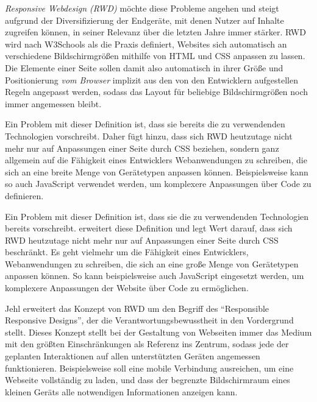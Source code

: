 \emph{Responsive Webdesign (RWD)} möchte diese Probleme angehen und steigt aufgrund der Diversifizierung der Endgeräte, mit denen Nutzer auf Inhalte zugreifen können, in seiner Relevanz über die letzten Jahre immer stärker.
RWD wird nach W3Schools \autocite{W3Schools.ResponsiveWebDesign.2024} als die Praxis definiert, Websites sich automatisch an verschiedene Bildschirmgrößen mithilfe von HTML und CSS anpassen zu lassen.
Die Elemente einer Seite sollen damit also automatisch in ihrer Größe und Positionierung \emph{vom Browser} implizit aus den von den Entwicklern aufgestellen Regeln angepasst werden, sodass das Layout für beliebige Bildschirmgrößen noch immer angemessen bleibt.

Ein Problem mit dieser Definition ist, dass sie bereits die zu verwendenden Technologien vorschreibt.
Daher fügt \autocite[S. 28]{Laati.ImplementingResponsiveDesignInIndustrialDashboardEditor.2017} hinzu, dass sich RWD heutzutage nicht mehr nur auf Anpassungen einer Seite durch CSS beziehen, sondern ganz allgemein auf die Fähigkeit eines Entwicklers Webanwendungen zu schreiben, die sich an eine breite Menge von Gerätetypen anpassen können.
Beispielsweise kann so auch JavaScript verwendet werden, um komplexere Anpassungen über Code zu definieren.

Ein Problem mit dieser Definition ist, dass sie die zu verwendenden Technologien bereits vorschreibt.
\autocite[S. 28]{Laati.ImplementingResponsiveDesignInIndustrialDashboardEditor.2017} erweitert diese Definition und legt Wert darauf, dass sich RWD heutzutage nicht mehr nur auf Anpassungen einer Seite durch CSS beschränkt.
Es geht vielmehr um die Fähigkeit eines Entwicklers, Webanwendungen zu schreiben, die sich an eine große Menge von Gerätetypen anpassen können.
So kann beispielsweise auch JavaScript eingesetzt werden, um komplexere Anpassungen der Website über Code zu ermöglichen.

Jehl \autocite{Jehl.ResponsibleResponsiveWebDesign.2014} erweitert das Konzept von RWD um den Begriff des "`Responsible Responsive Designs"', der die Verantwortungsbewusstheit in den Vordergrund stellt.
Dieses Konzept stellt bei der Gestaltung von Webseiten immer das Medium mit den größten Einschränkungen als Referenz ins Zentrum, sodass jede der geplanten Interaktionen auf allen unterstützten Geräten angemessen funktionieren.
Beispielsweise soll eine mobile Verbindung ausreichen, um eine Webseite vollständig zu laden, und dass der begrenzte Bildschirmraum eines kleinen Geräts alle notwendigen Informationen anzeigen kann.

